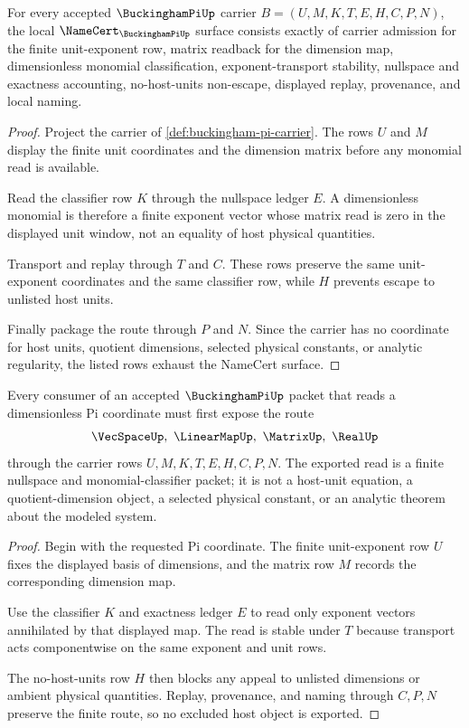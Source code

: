 \begin{theorem}
\label{thm:buckingham-pi-namecert-surface}
For every accepted $\BuckinghamPiUp$ carrier $B=(U,M,K,T,E,H,C,P,N)$, the local $\NameCert_{\BuckinghamPiUp}$ surface consists exactly of carrier admission for the finite unit-exponent row, matrix readback for the dimension map, dimensionless monomial classification, exponent-transport stability, nullspace and exactness accounting, no-host-units non-escape, displayed replay, provenance, and local naming.
\end{theorem}
\begin{proof}
Project the carrier of \autoref{def:buckingham-pi-carrier}. The rows $U$ and $M$ display the finite unit coordinates and the dimension matrix before any monomial read is available.

Read the classifier row $K$ through the nullspace ledger $E$. A dimensionless monomial is therefore a finite exponent vector whose matrix read is zero in the displayed unit window, not an equality of host physical quantities.

Transport and replay through $T$ and $C$. These rows preserve the same unit-exponent coordinates and the same classifier row, while $H$ prevents escape to unlisted host units.

Finally package the route through $P$ and $N$. Since the carrier has no coordinate for host units, quotient dimensions, selected physical constants, or analytic regularity, the listed rows exhaust the NameCert surface.
\end{proof}

\begin{theorem}
\label{thm:buckingham-pi-no-host-units-nonescape}
Every consumer of an accepted $\BuckinghamPiUp$ packet that reads a dimensionless Pi coordinate must first expose the route
$$
\VecSpaceUp,\ \LinearMapUp,\ \MatrixUp,\ \RealUp
$$
through the carrier rows $U,M,K,T,E,H,C,P,N$. The exported read is a finite nullspace and monomial-classifier packet; it is not a host-unit equation, a quotient-dimension object, a selected physical constant, or an analytic theorem about the modeled system.
\end{theorem}
\begin{proof}
Begin with the requested Pi coordinate. The finite unit-exponent row $U$ fixes the displayed basis of dimensions, and the matrix row $M$ records the corresponding dimension map.

Use the classifier $K$ and exactness ledger $E$ to read only exponent vectors annihilated by that displayed map. The read is stable under $T$ because transport acts componentwise on the same exponent and unit rows.

The no-host-units row $H$ then blocks any appeal to unlisted dimensions or ambient physical quantities. Replay, provenance, and naming through $C,P,N$ preserve the finite route, so no excluded host object is exported.
\end{proof}

